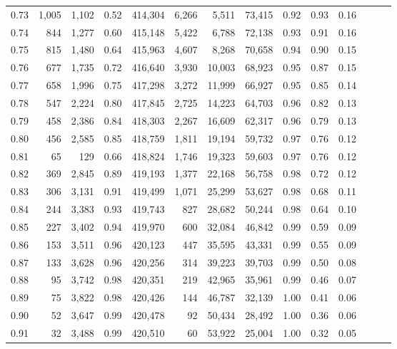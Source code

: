 \begin{tabular}{rrrrrrrrrrrrrr}
0.73 &  1,005 &  1,102 &  0.52 &  414,304 &    6,266 &   5,511 &  73,415 &  0.92 &  0.93 &      0.16 \\
0.74 &    844 &  1,277 &  0.60 &  415,148 &    5,422 &   6,788 &  72,138 &  0.93 &  0.91 &      0.16 \\
0.75 &    815 &  1,480 &  0.64 &  415,963 &    4,607 &   8,268 &  70,658 &  0.94 &  0.90 &      0.15 \\
0.76 &    677 &  1,735 &  0.72 &  416,640 &    3,930 &  10,003 &  68,923 &  0.95 &  0.87 &      0.15 \\
0.77 &    658 &  1,996 &  0.75 &  417,298 &    3,272 &  11,999 &  66,927 &  0.95 &  0.85 &      0.14 \\
0.78 &    547 &  2,224 &  0.80 &  417,845 &    2,725 &  14,223 &  64,703 &  0.96 &  0.82 &      0.13 \\
0.79 &    458 &  2,386 &  0.84 &  418,303 &    2,267 &  16,609 &  62,317 &  0.96 &  0.79 &      0.13 \\
0.80 &    456 &  2,585 &  0.85 &  418,759 &    1,811 &  19,194 &  59,732 &  0.97 &  0.76 &      0.12 \\
0.81 &     65 &    129 &  0.66 &  418,824 &    1,746 &  19,323 &  59,603 &  0.97 &  0.76 &      0.12 \\
0.82 &    369 &  2,845 &  0.89 &  419,193 &    1,377 &  22,168 &  56,758 &  0.98 &  0.72 &      0.12 \\
0.83 &    306 &  3,131 &  0.91 &  419,499 &    1,071 &  25,299 &  53,627 &  0.98 &  0.68 &      0.11 \\
0.84 &    244 &  3,383 &  0.93 &  419,743 &      827 &  28,682 &  50,244 &  0.98 &  0.64 &      0.10 \\
0.85 &    227 &  3,402 &  0.94 &  419,970 &      600 &  32,084 &  46,842 &  0.99 &  0.59 &      0.09 \\
0.86 &    153 &  3,511 &  0.96 &  420,123 &      447 &  35,595 &  43,331 &  0.99 &  0.55 &      0.09 \\
0.87 &    133 &  3,628 &  0.96 &  420,256 &      314 &  39,223 &  39,703 &  0.99 &  0.50 &      0.08 \\
0.88 &     95 &  3,742 &  0.98 &  420,351 &      219 &  42,965 &  35,961 &  0.99 &  0.46 &      0.07 \\
0.89 &     75 &  3,822 &  0.98 &  420,426 &      144 &  46,787 &  32,139 &  1.00 &  0.41 &      0.06 \\
0.90 &     52 &  3,647 &  0.99 &  420,478 &       92 &  50,434 &  28,492 &  1.00 &  0.36 &      0.06 \\
0.91 &     32 &  3,488 &  0.99 &  420,510 &       60 &  53,922 &  25,004 &  1.00 &  0.32 &      0.05 \\

\end{tabular}
